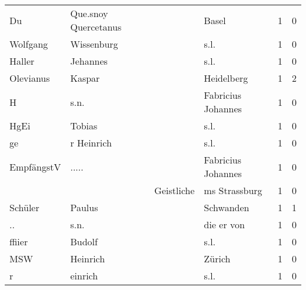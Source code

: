 \begin{center}
\begin{tiny}
\begin{longtabu}{llllrr}
                       Du &               Que.snoy Quercetanus &             &                                       Basel &          1 &         0 \\
                 Wolfgang &                         Wissenburg &             &                                        s.l. &          1 &         0 \\
                   Haller &                           Jehannes &             &                                        s.l. &          1 &         0 \\
                Olevianus &                             Kaspar &             &                                  Heidelberg &          1 &         2 \\
                        H &                               s.n. &             &                          Fabricius Johannes &          1 &         0 \\
                     HgEi &                             Tobias &             &                                        s.l. &          1 &         0 \\
                       ge &                         r Heinrich &             &                                        s.l. &          1 &         0 \\
               EmpfängstV &                              ..... &             &                          Fabricius Johannes &          1 &         0 \\
                          &                                    &  Geistliche &                               ms Strassburg &          1 &         0 \\
                  Schüler &                             Paulus &             &                                   Schwanden &          1 &         1 \\
                       .. &                               s.n. &             &                                  die er von &          1 &         0 \\
                   ffiier &                             Budolf &             &                                        s.l. &          1 &         0 \\
                      MSW &                           Heinrich &             &                                      Zürich &          1 &         0 \\
                        r &                            einrich &             &                                        s.l. &          1 &         0 \\

\end{longtabu}
\end{tiny}
\end{center}
